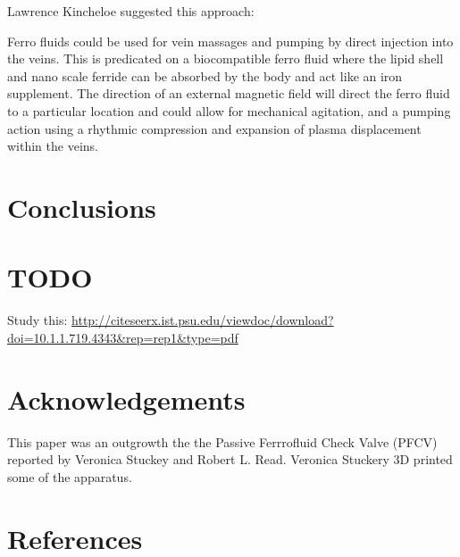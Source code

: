 \documentclass[12pt]{article}
\begin{document}
Lawrence Kincheloe suggested this approach:

Ferro fluids could be used for vein massages and pumping by direct injection into the veins. This is predicated on a biocompatible ferro fluid where the lipid shell and nano scale ferride can be absorbed by the body and act like an iron supplement. The direction of an external magnetic field will direct the ferro fluid to a particular location and could allow for mechanical agitation, and a pumping action using a rhythmic compression and expansion of plasma displacement within the veins.

\section{Conclusions}

\section{TODO}

Study this: \url{http://citeseerx.ist.psu.edu/viewdoc/download?doi=10.1.1.719.4343&rep=rep1&type=pdf}

\section{Acknowledgements}

This paper was an outgrowth the the Passive Ferrrofluid Check Valve (PFCV) \cite{stuckeynovel}
reported by Veronica Stuckey and Robert L. Read. Veronica Stuckery 3D printed
some of the apparatus.

\section*{References}



\end{document}
